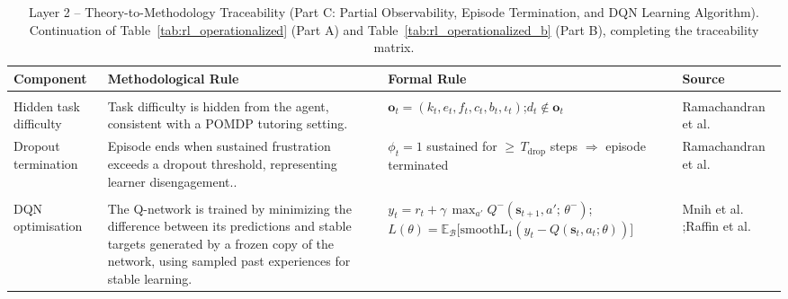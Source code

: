 \renewcommand{\arraystretch}{1.7}
\begin{table}[H]
\centering
\small
\caption{Layer 2 -- Theory-to-Methodology Traceability (Part C: Partial Observability, Episode Termination, and \ac{DQN} Learning Algorithm). Continuation of Table~\ref{tab:rl_operationalized} (Part A) and Table~\ref{tab:rl_operationalized_b} (Part B), completing the traceability matrix.}
\label{tab:rl_operationalized_c}
\begin{tabular}{>{\raggedright\arraybackslash}p{2.4cm}
                >{\raggedright\arraybackslash}p{5.0cm}
                >{\raggedright\arraybackslash}p{4.0cm}
                >{\raggedright\arraybackslash}p{2.2cm}}
\toprule
\textbf{Component} & \textbf{Methodological Rule} & \textbf{Formal Rule} & \textbf{Source} \\
\midrule
\multicolumn{4}{@{\hspace{0.3em}}l}{\small\bfseries Partial Observability and Episode Termination} \\
\midrule

Hidden task difficulty
    & Task difficulty is hidden from the agent, consistent with a \ac{POMDP} tutoring setting.
    & $\mathbf{o}_t = (k_t, e_t, f_t, c_t, b_t, \iota_t)$;\newline $d_t \notin \mathbf{o}_t$
    & Ramachandran et al. \cite{ramachandran_pomdp_2018} \\[0.4em]

Dropout termination
    & Episode ends when sustained frustration exceeds a dropout threshold, representing learner disengagement..
    & $\phi_t = 1$ sustained for ${\geq}\,T_{\text{drop}}$ steps $\Rightarrow$ episode terminated
    & Ramachandran et al. \cite{ramachandran_pomdp_2018} \\

\midrule
\multicolumn{4}{@{\hspace{0.3em}}l}{\small\bfseries \ac{DQN} Learning Algorithm} \\
\midrule

\ac{DQN} optimisation
    & The Q-network is trained by minimizing the difference between its predictions and stable targets generated by a frozen copy of the network, using sampled past experiences for stable learning.
    & $y_t = r_t + \gamma\,\max_{a'} Q^-\!(\mathbf{s}_{t+1}, a';\,\theta^-)$;\newline $L(\theta) = \mathbb{E}_{\mathcal{B}}\!\bigl[\mathrm{smoothL_1}(y_t - Q(\mathbf{s}_t, a_t;\theta))\bigr]$
    & Mnih et al. \cite{mnih_dqn_2015};\newline Raffin et al. \cite{raffin_sb3_2021} \\

\bottomrule
\end{tabular}
\end{table}
